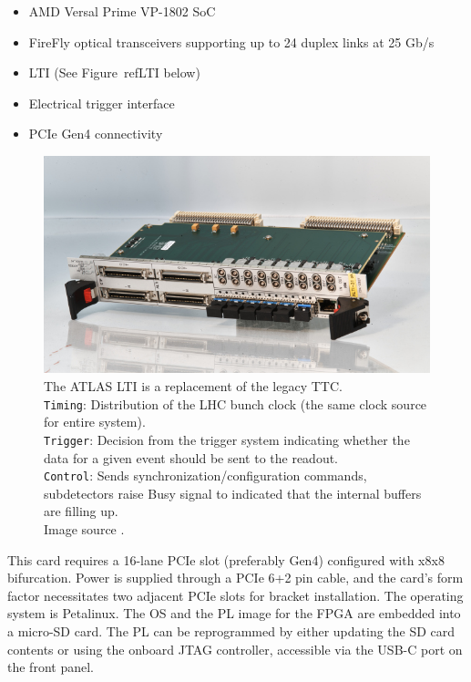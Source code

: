 \begin{itemize}
    \item AMD Versal Prime VP-1802 \acf{SoC}
    \item FireFly optical transceivers supporting up to 24 duplex links at 25 Gb/s \cite{firefly-optical-transceiver}
    \item \acf{LTI} (See Figure~ref{LTI} below)
    \item Electrical trigger interface
    \item \acs{PCIe} Gen4 connectivity
\end{itemize}

\begin{figure}[htbp]
\centering
\includegraphics[width=\textwidth]{images/felix/lti.jpg}
\caption[LTI]{The ATLAS \acf{LTI} is a replacement of the legacy \acf{TTC}.\\ \texttt{Timing}: Distribution of the \acs{LHC} bunch clock (the same clock source for entire system).\\\texttt{Trigger}: Decision from the trigger system indicating whether the data for a given event should be sent to the readout.\\ \texttt{Control}: Sends synchronization/configuration commands, subdetectors raise Busy signal to indicated that the internal buffers are filling up.\\Image source \protect\cite{lti}.}
\label{fig:LTI}
\end{figure}

This card requires a 16-lane \acs{PCIe} slot (preferably Gen4) configured with x8x8 bifurcation. Power is supplied through a \acs{PCIe} 6+2 pin cable, and the card's form factor necessitates two adjacent \acs{PCIe} slots for bracket installation. 
The operating system is Petalinux. The OS and the \acl{PL} image for the \acs{FPGA} are embedded into a micro-SD card. The \acs{PL} can be reprogrammed by either updating the SD card contents or using the onboard \ac{JTAG} controller, accessible via the USB-C port on the front panel.


